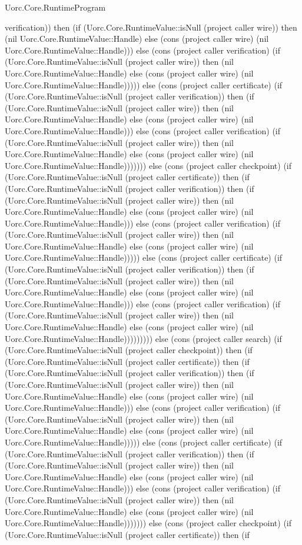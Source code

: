 \begin{lexlean}{Uorc.Core.RuntimeProgram}
\begin{semanticmodule}
{verification)) then (if (Uorc.Core.RuntimeValue::isNull (project caller wire)) then (nil Uorc.Core.RuntimeValue::Handle) else (cons (project caller wire) (nil Uorc.Core.RuntimeValue::Handle))) else (cons (project caller verification) (if (Uorc.Core.RuntimeValue::isNull (project caller wire)) then (nil Uorc.Core.RuntimeValue::Handle) else (cons (project caller wire) (nil Uorc.Core.RuntimeValue::Handle))))) else (cons (project caller certificate) (if (Uorc.Core.RuntimeValue::isNull (project caller verification)) then (if (Uorc.Core.RuntimeValue::isNull (project caller wire)) then (nil Uorc.Core.RuntimeValue::Handle) else (cons (project caller wire) (nil Uorc.Core.RuntimeValue::Handle))) else (cons (project caller verification) (if (Uorc.Core.RuntimeValue::isNull (project caller wire)) then (nil Uorc.Core.RuntimeValue::Handle) else (cons (project caller wire) (nil Uorc.Core.RuntimeValue::Handle))))))) else (cons (project caller checkpoint) (if (Uorc.Core.RuntimeValue::isNull (project caller certificate)) then (if (Uorc.Core.RuntimeValue::isNull (project caller verification)) then (if (Uorc.Core.RuntimeValue::isNull (project caller wire)) then (nil Uorc.Core.RuntimeValue::Handle) else (cons (project caller wire) (nil Uorc.Core.RuntimeValue::Handle))) else (cons (project caller verification) (if (Uorc.Core.RuntimeValue::isNull (project caller wire)) then (nil Uorc.Core.RuntimeValue::Handle) else (cons (project caller wire) (nil Uorc.Core.RuntimeValue::Handle))))) else (cons (project caller certificate) (if (Uorc.Core.RuntimeValue::isNull (project caller verification)) then (if (Uorc.Core.RuntimeValue::isNull (project caller wire)) then (nil Uorc.Core.RuntimeValue::Handle) else (cons (project caller wire) (nil Uorc.Core.RuntimeValue::Handle))) else (cons (project caller verification) (if (Uorc.Core.RuntimeValue::isNull (project caller wire)) then (nil Uorc.Core.RuntimeValue::Handle) else (cons (project caller wire) (nil Uorc.Core.RuntimeValue::Handle))))))))) else (cons (project caller search) (if (Uorc.Core.RuntimeValue::isNull (project caller checkpoint)) then (if (Uorc.Core.RuntimeValue::isNull (project caller certificate)) then (if (Uorc.Core.RuntimeValue::isNull (project caller verification)) then (if (Uorc.Core.RuntimeValue::isNull (project caller wire)) then (nil Uorc.Core.RuntimeValue::Handle) else (cons (project caller wire) (nil Uorc.Core.RuntimeValue::Handle))) else (cons (project caller verification) (if (Uorc.Core.RuntimeValue::isNull (project caller wire)) then (nil Uorc.Core.RuntimeValue::Handle) else (cons (project caller wire) (nil Uorc.Core.RuntimeValue::Handle))))) else (cons (project caller certificate) (if (Uorc.Core.RuntimeValue::isNull (project caller verification)) then (if (Uorc.Core.RuntimeValue::isNull (project caller wire)) then (nil Uorc.Core.RuntimeValue::Handle) else (cons (project caller wire) (nil Uorc.Core.RuntimeValue::Handle))) else (cons (project caller verification) (if (Uorc.Core.RuntimeValue::isNull (project caller wire)) then (nil Uorc.Core.RuntimeValue::Handle) else (cons (project caller wire) (nil Uorc.Core.RuntimeValue::Handle))))))) else (cons (project caller checkpoint) (if (Uorc.Core.RuntimeValue::isNull (project caller certificate)) then (if }
\end{semanticmodule}
\end{lexlean}
